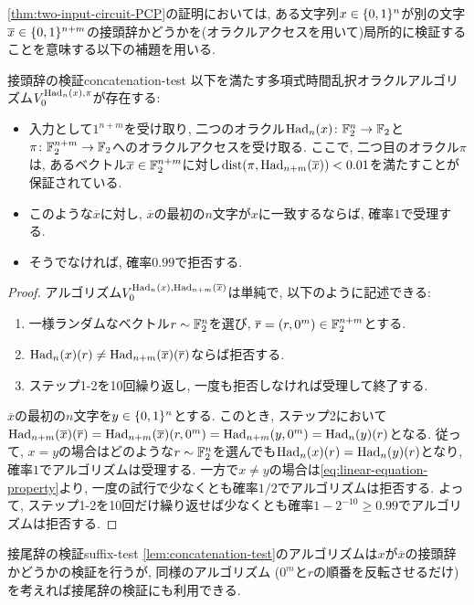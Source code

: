 \cref{thm:two-input-circuit-PCP}の証明においては, ある文字列$x\in\{0,1\}^n$が別の文字$\overline{x}\in\{0,1\}^{n+m}$の接頭辞かどうかを(オラクルアクセスを用いて)局所的に検証することを意味する以下の補題を用いる.
\begin{lemma}{接頭辞の検証}{concatenation-test}
  以下を満たす多項式時間乱択オラクルアルゴリズム$V_0^{\mathrm{Had}_n(x),\pi}$が存在する:
  \begin{itemize}
    \item 入力として$1^{n+m}$を受け取り, 二つのオラクル$\mathrm{Had}_n(x)\colon \mathbb{F}_2^n\to\mathbb{F}_2$と$\pi\colon \mathbb{F}_2^{n+m}\to\mathbb{F}_2$へのオラクルアクセスを受け取る. ここで, 二つ目のオラクル$\pi$は, あるベクトル$\overline{x}\in\mathbb{F}_2^{n+m}$に対し$\mathrm{dist}(\pi,\mathrm{Had}_{n+m}(\overline{x})) < 0.01$を満たすことが保証されている.
    \item このような$\overline{x}$に対し, $\overline{x}$の最初の$n$文字が$x$に一致するならば, 確率$1$で受理する.
    \item そうでなければ, 確率$0.99$で拒否する.
  \end{itemize}
\end{lemma}
\begin{proof}
  アルゴリズム$V_0^{\mathrm{Had}_n(x),\mathrm{Had}_{n+m}(\overline{x})}$は単純で, 以下のように記述できる:
  \begin{enumerate}
    \item 一様ランダムなベクトル$r\sim\mathbb{F}_2^n$を選び, $\overline{r}=(r,0^m)\in\mathbb{F}_2^{n+m}$とする.
    \item $\mathrm{Had}_n(x)(r) \ne \mathrm{Had}_{n+m}(\overline{x})(\overline{r})$ならば拒否する.
    \item ステップ1-2を10回繰り返し, 一度も拒否しなければ受理して終了する.
  \end{enumerate}

  $\overline{x}$の最初の$n$文字を$y\in\{0,1\}^n$とする.
  このとき, ステップ2において$\mathrm{Had}_{n+m}(\overline{x})(\overline{r}) = \mathrm{Had}_{n+m}(\overline{x})(r,0^m) = \mathrm{Had}_{n+m}(y,0^m) = \mathrm{Had}_{n}(y)(r)$となる.
  従って, $x=y$の場合はどのような$r\sim\mathbb{F}_2^n$を選んでも$\mathrm{Had}_n(x)(r) = \mathrm{Had}_n(y)(r)$となり, 確率$1$でアルゴリズムは受理する.
  一方で$x\ne y$の場合は\cref{eq:linear-equation-property}より, 一度の試行で少なくとも確率$1/2$でアルゴリズムは拒否する.
  よって, ステップ1-2を10回だけ繰り返せば少なくとも確率$1-2^{-10}\ge 0.99$でアルゴリズムは拒否する.
\end{proof}

\begin{remark}{接尾辞の検証}{suffix-test}
  \cref{lem:concatenation-test}のアルゴリズムは$x$が$\overline{x}$の接頭辞かどうかの検証を行うが, 同様のアルゴリズム ($0^m$と$r$の順番を反転させるだけ)を考えれば接尾辞の検証にも利用できる.
\end{remark}

